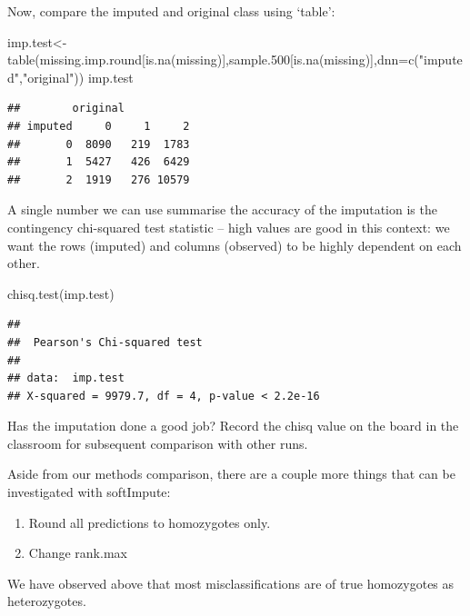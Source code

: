 \documentclass[
]{book}
\newenvironment{Shaded}{\begin{snugshade}}{\end{snugshade}}
\newcommand{\AttributeTok}[1]{\textcolor[rgb]{0.77,0.63,0.00}{#1}}
\newcommand{\FloatTok}[1]{\textcolor[rgb]{0.00,0.00,0.81}{#1}}
\newcommand{\FunctionTok}[1]{\textcolor[rgb]{0.00,0.00,0.00}{#1}}
\newcommand{\NormalTok}[1]{#1}
\newcommand{\OtherTok}[1]{\textcolor[rgb]{0.56,0.35,0.01}{#1}}
\newcommand{\StringTok}[1]{\textcolor[rgb]{0.31,0.60,0.02}{#1}}
\providecommand{\tightlist}{%
  \setlength{\itemsep}{0pt}\setlength{\parskip}{0pt}}
\begin{document}
Now, compare the imputed and original class using `table':

\begin{Shaded}
\begin{Highlighting}[]
\NormalTok{imp.test}\OtherTok{\textless{}{-}}\FunctionTok{table}\NormalTok{(missing.imp.round[}\FunctionTok{is.na}\NormalTok{(missing)],sample}\FloatTok{.500}\NormalTok{[}\FunctionTok{is.na}\NormalTok{(missing)],}\AttributeTok{dnn=}\FunctionTok{c}\NormalTok{(}\StringTok{"imputed"}\NormalTok{,}\StringTok{"original"}\NormalTok{))}
\NormalTok{imp.test}
\end{Highlighting}
\end{Shaded}

\begin{verbatim}
##        original
## imputed     0     1     2
##       0  8090   219  1783
##       1  5427   426  6429
##       2  1919   276 10579
\end{verbatim}

A single number we can use summarise the accuracy of the imputation is the contingency chi-squared test statistic -- high values are good in this context: we want the rows (imputed) and columns (observed) to be highly dependent on each other.

\begin{Shaded}
\begin{Highlighting}[]
\FunctionTok{chisq.test}\NormalTok{(imp.test) }
\end{Highlighting}
\end{Shaded}

\begin{verbatim}
## 
##  Pearson's Chi-squared test
## 
## data:  imp.test
## X-squared = 9979.7, df = 4, p-value < 2.2e-16
\end{verbatim}

Has the imputation done a good job? Record the chisq value on the board in the classroom for subsequent comparison with other runs.

Aside from our methods comparison, there are a couple more things that can be investigated with softImpute:

\begin{enumerate}
\def\labelenumi{\alph{enumi})}
\tightlist
\item
  Round all predictions to homozygotes only.
\item
  Change rank.max
\end{enumerate}

We have observed above that most misclassifications are of true homozygotes as heterozygotes.
\end{document}
